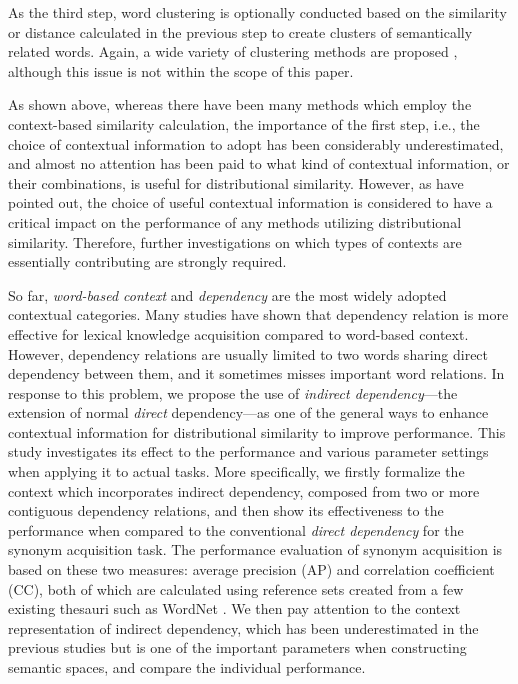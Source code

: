 \documentclass[english]{jnlp_1.4}
\begin{document}
As the third step, word clustering is optionally conducted based on
the similarity or distance calculated in the previous step to create
clusters of semantically related words. Again, a wide variety of
clustering methods are proposed \cite{Pereira:95,Sakaki:07}, although
this issue is not within the scope of this paper.

As shown above, whereas there have been many methods which employ the
context-based similarity calculation, the importance of the first
step, i.e., the choice of contextual information to adopt has been
considerably underestimated, and almost no attention has been paid to
what kind of contextual information, or their combinations, is useful
for distributional similarity. However, as
\cite{Curran:02:scaling,Hagiwara:06} have pointed out, the choice of
useful contextual information is considered to have a critical impact
on the performance of any methods utilizing distributional
similarity. Therefore, further investigations on which types of
contexts are essentially contributing are strongly required.


So far, {\em word-based context} and {\em dependency} are the most
widely adopted contextual categories. Many studies have shown that
dependency relation is more effective for lexical knowledge
acquisition compared to word-based context. However, dependency
relations are usually limited to two words sharing direct dependency
between them, and it sometimes misses important word relations.  In
response to this problem, we propose the use of {\em indirect
dependency}---the extension of normal {\em direct} dependency---as
one of the general ways to enhance contextual information for
distributional similarity to improve performance. This study
investigates its effect to the performance and various parameter
settings when applying it to actual tasks. More specifically, we
firstly formalize the context which incorporates indirect dependency,
composed from two or more contiguous dependency relations, and then
show its effectiveness to the performance when compared to the
conventional {\em direct dependency} for the synonym acquisition
task. The performance evaluation of synonym acquisition is based on
these two measures: average precision (AP) and correlation coefficient
(CC), both of which are calculated using reference sets created from a
few existing thesauri such as WordNet \cite{Fellbaum:98}. We then pay
attention to the context representation of indirect dependency, which
has been underestimated in the previous studies but is one of the
important parameters when constructing semantic spaces, and compare
the individual performance.
\end{document}
